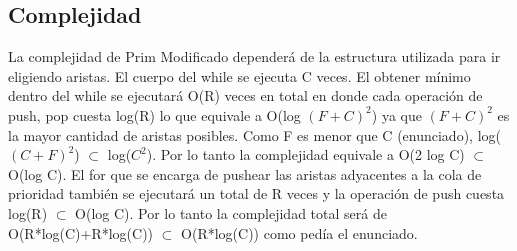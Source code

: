 \subsection{Complejidad}


La complejidad de Prim Modificado dependerá de la estructura utilizada para ir eligiendo aristas. El cuerpo del while se ejecuta C veces. El obtener mínimo dentro del while se ejecutará O(R) veces en total en donde cada operación de push, pop cuesta log(R) lo que equivale a O(log $(F+C)^2$) ya que $(F+C)^2$ es la mayor cantidad de aristas posibles. Como F es menor que C (enunciado), log($(C+F)^2$) $\subset$ log($C^2$). Por lo tanto la complejidad equivale a O(2 log C) $\subset$ O(log C). El for que se encarga de pushear las aristas adyacentes a la cola de prioridad también se ejecutará un total de R veces y la operación de push cuesta log(R) $\subset$ O(log C). Por lo tanto la complejidad total será de O(R*log(C)+R*log(C)) $\subset$ O(R*log(C)) como pedía el enunciado.
